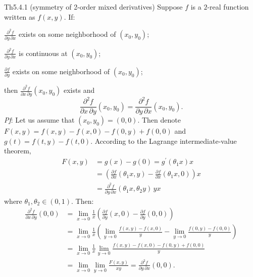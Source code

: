 \documentclass{article}
\newcommand{\parfrac}[2]{\frac{\partial #1}{\partial #2}}
\newcommand{\biparfrac}[2]{\frac{\partial^2 #1}{#2}}
\begin{document}
\begin{Th}{Th5.4.1 (symmetry of 2-order mixed derivatives)}
    Suppose $f$ is a $2$-real function written as $f(x,y)$. If:
    \begin{compactenum}
        \item $\biparfrac{f}{\partial y\,\partial x}$ exists on some neighborhood of $(x_0, y_0)$;
        \item $\biparfrac{f}{\partial y\,\partial x}$ is continuous at $(x_0, y_0)$;
        \item $\parfrac{f}{y}$ exists on some neighborhood of $(x_0, y_0)$;
    \end{compactenum}
    then $\biparfrac{f}{\partial x\,\partial y}(x_0, y_0)$ exists and 
    $$ \biparfrac{f}{\partial x\,\partial y}(x_0, y_0) = \biparfrac{f}{\partial y\,\partial x}(x_0, y_0). $$
    \tcblower
    \textit{Pf}: Let us assume that $(x_0, y_0) = (0,0)$. Then denote $F(x,y) = f(x,y)-f(x,0)-f(0,y)+f(0,0)$ and $g(t) = f(t,y) - f(t,0)$. According to the Lagrange intermediate-value theorem,
    $$ \begin{aligned}
        F(x,y) &= g(x) - g(0) = g^\prime (\theta_1 x) x \\
        &= \left(\parfrac{f}{x}(\theta_1 x, y) - \parfrac{f}{x}(\theta_1x, 0)\right)x \\
        &= \biparfrac{f}{\partial y\,\partial x}(\theta_1 x, \theta_2 y)\, yx
    \end{aligned}
    $$
    where $\theta_1, \theta_2\in (0,1)$.
    Then:
    $$
    \begin{aligned}
        \biparfrac{f}{\partial x\, \partial y}(0,0) &= \lim_{x\to 0}\frac{1}{x}\left(\parfrac{f}{y}(x,0) - \parfrac{f}{y}(0,0)\right) \\
        &= \lim_{x\to 0}\frac{1}{x}\left(\lim_{y\to 0}\frac{f(x,y)-f(x,0)}{y} - \lim_{y\to 0}\frac{f(0,y)-f(0,0)}{y}\right) \\
        &= \lim_{x\to 0}\frac{1}{x}\lim_{y\to 0}\frac{f(x,y)-f(x,0)-f(0,y)+f(0,0)}{y} \\
        &= \lim_{x\to 0}\lim_{y\to 0}\frac{F(x,y)}{xy} = \biparfrac{f}{\partial y\,\partial x}(0,0).
    \end{aligned}
    $$
\end{Th}
\end{document}
